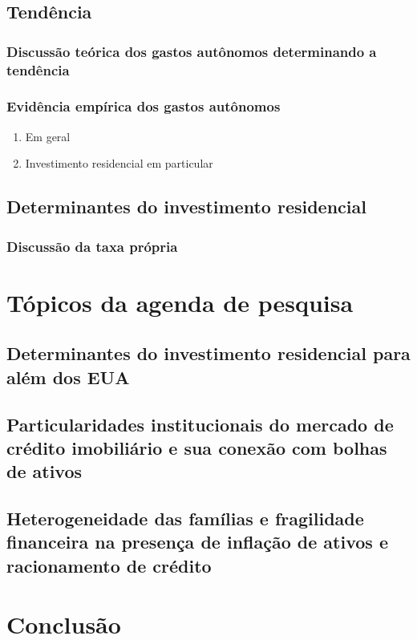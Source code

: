 \documentclass[11pt]{article}
\begin{document}
\subsection{Tendência}
\label{sec:orgfc218cd}

\subsubsection{Discussão teórica dos gastos autônomos determinando a tendência}
\label{sec:orgfb0f52b}

\subsubsection{Evidência empírica dos gastos autônomos}
\label{sec:orgbc8476f}

\begin{enumerate}
\item Em geral
\label{sec:org4943eaa}

\item Investimento residencial em particular
\label{sec:orgf560caa}
\end{enumerate}

\subsection{Determinantes do investimento residencial}
\label{sec:org844515a}

\subsubsection{Discussão da taxa própria}
\label{sec:org896c223}

\section{Tópicos da agenda de pesquisa}
\label{sec:orgdf41c4b}

\subsection{Determinantes do investimento residencial para além dos EUA}
\label{sec:org3141fbb}

\subsection{Particularidades institucionais do mercado de crédito imobiliário e sua conexão com bolhas de ativos}
\label{sec:org28971f4}

\subsection{Heterogeneidade das famílias e fragilidade financeira na presença de inflação de ativos e racionamento de crédito}
\label{sec:org81c310f}

\section{Conclusão}
\label{sec:org948e627}
\end{document}
